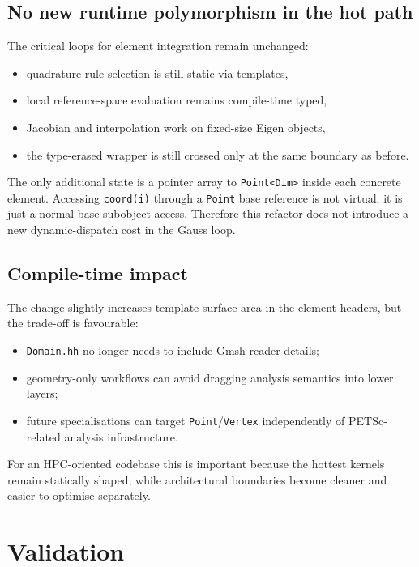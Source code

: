 \subsection{No new runtime polymorphism in the hot path}

The critical loops for element integration remain unchanged:
\begin{itemize}[nosep]
  \item quadrature rule selection is still static via templates,
  \item local reference-space evaluation remains compile-time typed,
  \item Jacobian and interpolation work on fixed-size Eigen objects,
  \item the type-erased wrapper is still crossed only at the same boundary as
        before.
\end{itemize}

The only additional state is a pointer array to \texttt{Point<Dim>} inside each
concrete element.  Accessing \texttt{coord(i)} through a \texttt{Point} base
reference is not virtual; it is just a normal base-subobject access.  Therefore
this refactor does not introduce a new dynamic-dispatch cost in the Gauss loop.

\subsection{Compile-time impact}

The change slightly increases template surface area in the element headers, but
the trade-off is favourable:
\begin{itemize}[nosep]
  \item \texttt{Domain.hh} no longer needs to include Gmsh reader details;
  \item geometry-only workflows can avoid dragging analysis semantics into
        lower layers;
  \item future specialisations can target \texttt{Point}/\texttt{Vertex}
        independently of PETSc-related analysis infrastructure.
\end{itemize}

For an HPC-oriented codebase this is important because the hottest kernels
remain statically shaped, while architectural boundaries become cleaner and
easier to optimise separately.

\section{Validation}

